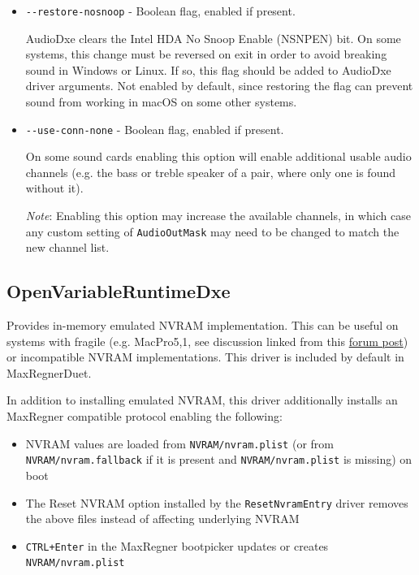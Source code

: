 \documentclass[]{article}
\makeatletter
\providecommand{\tightlist}{%
  \setlength{\itemsep}{0pt}\setlength{\parskip}{0pt}}
\renewcommand{\label}[1]{%
\zref@wrapper@immediate{\oldlabel{#1}}}  %
\makeatother
\begin{document}
\begin{itemize}
  \texttt{HDA: GPIO setup on pins 0x0F - Success} \medskip

  Values for driver parameters can be specified in hexadecimal beginning with \texttt{0x} or
  in decimal, e.g. \texttt{-{}-gpio-pins=0x12} or \texttt{-{}-gpio-pins=18}. \medskip

  \item \texttt{-{}-restore-nosnoop} - Boolean flag, enabled if present. \medskip

  AudioDxe clears the Intel HDA No Snoop Enable (NSNPEN) bit. On some systems, this change must
  be reversed on exit in order to avoid breaking sound in Windows or Linux. If so, this flag should
  be added to AudioDxe driver arguments.
  Not enabled by default, since restoring the flag can prevent sound from working in macOS on
  some other systems. \medskip

  \item \texttt{-{}-use-conn-none} - Boolean flag, enabled if present. \medskip

  On some sound cards enabling this option will enable additional usable audio channels (e.g.
  the bass or treble speaker of a pair, where only one is found without it).
  \medskip

  \emph{Note}: Enabling this option may increase the available channels, in which case any
  custom setting of \texttt{AudioOutMask} may need to be changed to match the new channel list.
  \medskip
\end{itemize}

\subsection{OpenVariableRuntimeDxe}\label{emunvram}

Provides in-memory emulated NVRAM implementation. This can be useful on systems with fragile
(e.g. MacPro5,1, see discussion linked from this \href{https://forums.macrumors.com/posts/30945127}{forum post})
or incompatible NVRAM implementations. This driver is included by default in MaxRegnerDuet.

In addition to installing emulated NVRAM, this driver additionally installs an MaxRegner compatible
protocol enabling the following:

\begin{itemize}
\tightlist
  \item NVRAM values are loaded from \texttt{NVRAM/nvram.plist} (or from \texttt{NVRAM/nvram.fallback}
  if it is present and \texttt{NVRAM/nvram.plist} is missing) on boot
  \item The Reset NVRAM option installed by the \texttt{ResetNvramEntry} driver removes the above files instead
  of affecting underlying NVRAM
  \item \texttt{CTRL+Enter} in the MaxRegner bootpicker updates or creates \texttt{NVRAM/nvram.plist}
\end{itemize}
\end{document}
